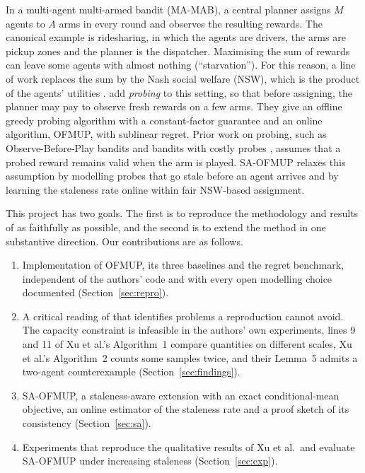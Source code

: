 \documentclass[letterpaper]{article}
\begin{document}
In a multi-agent multi-armed bandit (MA-MAB), a central planner assigns $M$
agents to $A$ arms in every round and observes the resulting rewards. The
canonical example is ridesharing, in which the agents are drivers, the arms are
pickup zones and the planner is the dispatcher. Maximising the sum of rewards
can leave some agents with almost nothing (``starvation''). For this reason, a
line of work replaces the sum by the Nash social welfare (NSW), which is the
product of the agents' utilities
\citep{kaneko1979nash,caragiannis2019unreasonable,hossain2021fair,jones2023efficient}.
\citet{xu2026fair} add \emph{probing} to this setting, so that before assigning,
the planner may pay to observe fresh rewards on a few arms. They give an offline
greedy probing algorithm with a constant-factor guarantee and an online
algorithm, OFMUP, with sublinear regret. Prior work on probing, such as
Observe-Before-Play bandits \citep{zuo2020observe} and bandits with costly probes
\citep{elumar2024costly}, assumes that a probed reward remains valid when the arm
is played. SA-OFMUP relaxes this assumption by modelling probes that go stale
before an agent arrives and by learning the staleness rate online within fair
NSW-based assignment.

This project has two goals. The first is to reproduce the methodology and
results of \citet{xu2026fair} as faithfully as possible, and the second is to
extend the method in one substantive direction. Our contributions are as
follows.
\begin{enumerate}
  \item Implementation of OFMUP, its three baselines and the regret benchmark,
        independent of the authors' code and with every open modelling choice
        documented (Section~\ref{sec:repro}).
  \item A critical reading of \citet{xu2026fair} that identifies problems a
        reproduction cannot avoid. The capacity constraint is infeasible in the
        authors' own experiments, lines 9 and 11 of Xu et al.'s Algorithm~1
        compare quantities on different scales, Xu et al.'s Algorithm~2 counts
        some samples twice, and their Lemma~5 admits a two-agent counterexample
        (Section~\ref{sec:findings}).
  \item SA-OFMUP, a staleness-aware extension with an exact conditional-mean
        objective, an online estimator of the staleness rate and a proof sketch
        of its consistency (Section~\ref{sec:sa}).
  \item Experiments that reproduce the qualitative results of Xu et al.\ and
        evaluate SA-OFMUP under increasing staleness (Section~\ref{sec:exp}).
\end{enumerate}
\end{document}
